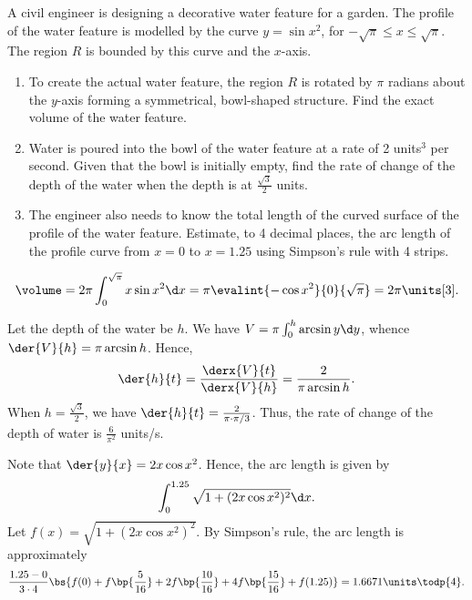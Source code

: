 \begin{problem}
    A civil engineer is designing a decorative water feature for a garden. The profile of the water feature is modelled by the curve $y = \sin{x^2}$, for $-\sqrt{\pi} \leq x \leq \sqrt{\pi}$. The region $R$ is bounded by this curve and the $x$-axis.

    \begin{enumerate}
        \item To create the actual water feature, the region $R$ is rotated by $\pi$ radians about the $y$-axis forming a symmetrical, bowl-shaped structure. Find the exact volume of the water feature.
        \item Water is poured into the bowl of the water feature at a rate of 2 units$^3$ per second. Given that the bowl is initially empty, find the rate of change of the depth of the water when the depth is at $\frac{\sqrt3}{2}$ units.
        \item The engineer also needs to know the total length of the curved surface of the profile of the water feature. Estimate, to 4 decimal places, the arc length of the profile curve from $x = 0$ to $x = 1.25$ using Simpson's rule with 4 strips.
    \end{enumerate}
\end{problem}
\begin{solution}
    \begin{ppart}
        \[\volume = 2\pi \int_0^{\sqrt\pi} x \sin{x^2} \d x = \pi \evalint{-\cos{x^2}}{0}{\sqrt\pi} = 2\pi \units[3].\]
    \end{ppart}
    \begin{ppart}
        Let the depth of the water be $h$. We have $V = \pi \int_0^h \arcsin{y} \d y$, whence $\der{V}{h} = \pi \arcsin{h}$. Hence, \[\der{h}{t} = \frac{\derx{V}{t}}{\derx{V}{h}} = \frac2{\pi \arcsin{h}}.\] When $h = \frac{\sqrt3}2$, we have $\der{h}{t} = \frac2{\pi \cdot \pi/3}$. Thus, the rate of change of the depth of water is $\frac6{\pi^2}$ units/s.
    \end{ppart}
    \begin{ppart}
        Note that $\der{y}{x} = 2x\cos{x^2}$. Hence, the arc length is given by \[\int_0^{1.25} \sqrt{1 + (2x\cos{x^2})^2} \d x.\] Let $f(x) = \sqrt{1 + (2x\cos{x^2})^2}$. By Simpson's rule, the arc length is approximately \[\frac{1.25 - 0}{3 \cdot 4} \bs{f(0) + f\bp{\frac5{16}} + 2f\bp{\frac{10}{16}} + 4f\bp{\frac{15}{16}} + f(1.25)} = 1.6671 \units \todp{4}.\]
    \end{ppart}
\end{solution}

